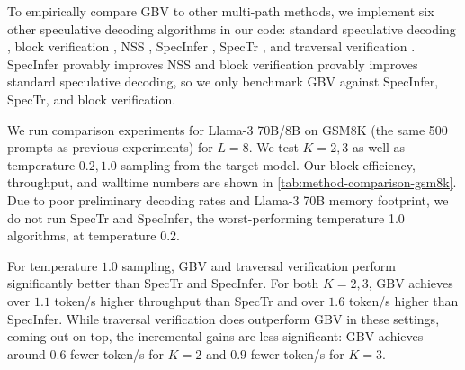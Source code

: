 \documentclass{article}
\theoremstyle{plain}
\theoremstyle{definition}
\theoremstyle{remark}
\begin{document}
To empirically compare GBV to other multi-path methods, we implement six other speculative decoding algorithms in our code: standard speculative decoding \citep{leviathan2023fast,chen2023accelerating}, block verification \citep{sun2024block}, NSS \citep{miao2024specinfer}, SpecInfer \citep{miao2024specinfer}, SpecTr \citep{sun2023spectr}, and traversal verification \citep{weng2025traversal}. SpecInfer provably improves NSS and block verification provably improves standard speculative decoding, so we only benchmark GBV against SpecInfer, SpecTr, and block verification. 

We run comparison experiments for Llama-3 70B/8B on GSM8K (the same 500 prompts as previous experiments) for $L=8$. We test $K=2,3$ as well as temperature $0.2,1.0$ sampling from the target model. Our block efficiency, throughput, and walltime numbers are shown in \cref{tab:method-comparison-gsm8k}. Due to poor preliminary decoding rates and Llama-3 70B memory footprint, we do not run SpecTr and SpecInfer, the worst-performing temperature 1.0 algorithms, at temperature 0.2.

For temperature $1.0$ sampling, GBV and traversal verification perform significantly better than SpecTr and SpecInfer. For both $K=2,3$, GBV achieves over $1.1$ token/s higher throughput than SpecTr and over $1.6$ token/s higher than SpecInfer. While traversal verification does outperform GBV in these settings, coming out on top, the incremental gains are less significant: GBV achieves around $0.6$ fewer token/s for $K=2$ and $0.9$ fewer token/s for $K=3$. 
\end{document}
